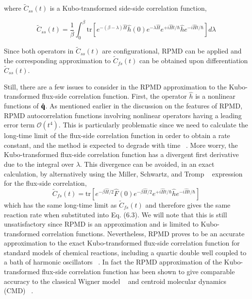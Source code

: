 \documentclass[phd,tocprelim]{cornell}
\begin{document}
 where $\tilde{C}_{ss}(t)$ is a Kubo-transformed side-side correlation function,
 
 \begin{equation}
\tilde{C}_{ss}(t)= \frac{1}{\beta} \int_{0}^{\beta} \textrm{tr}[ e^{-(\beta - \lambda)\hat{H}} \hat{h}(0) e^{-\lambda \hat{H}} e^{+i \hat{H}t/\hbar} \hat{h}e^{-i \hat{H}t/\hbar} ]d\lambda
\end{equation}
 
 Since both operators in $\tilde{C}_{ss}(t)$ are configurational, RPMD can be applied and the corresponding approximation to $\tilde{C}_{fs}(t)$ can be obtained upon differentiation $\tilde{C}_{ss}(t)$. 
 
Still, there are a few issues to consider in the RPMD approximation to the Kubo-transformed flux-side correlation function. First, the operator $\hat{h}$ is a nonlinear functions of ${\hat{\bf{q}}}$. As mentioned earlier in the discussion on the features of RPMD, RPMD autocorrelation functions involving nonlinear operators having a leading error term $\mathcal{O}(t^4)$. This is particularly problematic  since we need to calculate the long-time limit of the flux-side correlation function in order to obtain a rate constant, and the method is expected to degrade with time ~\cite{MANO2006}. More worry, the Kubo-transformed flux-side correlation function has a divergent first derivative due to the integral over $\lambda$. 
 This divergence can be avoided, in an exact calculation, by alternatively using the Miller, Schwartz, and Tromp ~\cite{TROMP1983} expression for the flux-side correlation, 
 \begin{equation}
\tilde{C}_{fs}(t)= \textrm{tr}[ e^{-\beta\hat{H}/2} \hat{F}(0) e^{-\beta\hat{H}/2} e^{+i \hat{H}t/\hbar} \hat{h}e^{-i \hat{H}t/\hbar} ]
\end{equation}
 which has the same long-time limit as $\tilde{C}_{fs}(t)$ and therefore gives the same reaction rate when substituted into Eq. (6.3). We will note that this is still unsatisfactory since RPMD is an approximation and is limited to Kubo-transformed correlation functions. Nevertheless, RPMD proves to be an accurate approximation to the exact Kubo-transformed flux-side correlation function for standard models of chemical reactions, including a quartic double well coupled to a bath of harmonic oscillators ~\cite{MANO2005}. In fact the RPMD approximation of the Kubo-transformed flux-side correlation function has been shown to give comparable accuracy to the classical Wigner model ~\cite{MILLER1998,MILLER1998-2} and centroid molecular dynamics (CMD) ~\cite{VOTH2001}.
 
\end{document}
